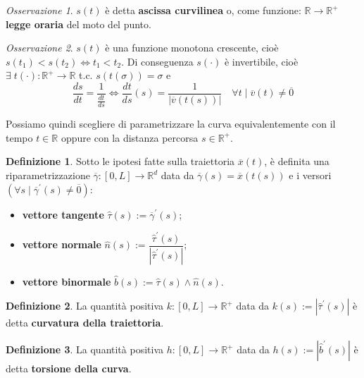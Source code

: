 \documentclass{book}
\theoremstyle{plain}
\theoremstyle{plain}
\theoremstyle{plain}
\theoremstyle{plain}
\theoremstyle{plain}
\theoremstyle{definition}
\newtheorem{defi}{Definizione}[chapter]
\theoremstyle{remark}
\newtheorem*{oss}{Osservazione}
\theoremstyle{definition}
\begin{document}
\begin{oss}
    $s(t)$ è detta \textbf{ascissa curvilinea} o, come funzione: $\mathbb{R} \to \mathbb{R}^{+}$ \textbf{legge oraria} del moto del punto.
    
\end{oss}

\begin{oss}
     $s(t)$ è una funzione monotona crescente, cioè $s(t_1) < s(t_2) \iff t_1 < t_2$. Di conseguenza $s(\cdot)$ è invertibile, cioè  $\exists \; t(\cdot): \mathbb{R}^{+} \to \mathbb{R}$ t.c. $s(t(\sigma))=\sigma$ e
\begin{displaymath}
    \frac{ds}{dt}=\frac{1}{\frac{dt}{ds}} \iff \frac{dt}{ds}(s)=\frac{1}{|\overline{v}(t(s))|} \quad \forall t \mid \overline{v}(t) \neq \overline{0}
\end{displaymath}

\noindent Possiamo quindi scegliere di parametrizzare la curva equivalentemente con il tempo $t \in \mathbb{R}$ oppure con la distanza percorsa $s \in \mathbb{R}^{+}$.
\end{oss}

\begin{defi}
    Sotto le ipotesi fatte sulla traiettoria $\overline{x}(t)$, è definita una riparametrizzazione $\overline{\gamma}: [0, L] \to \mathbb{R}^{d}$ data da $\overline{\gamma}(s)=\overline{x}(t(s))$ e i versori $(\forall s \mid \overline{\gamma}^{\prime}(s)\neq \overline{0})$:
    
    \begin{itemize}
        \item \textbf{vettore tangente} $\hat{\tau}(s):=\overline{\gamma}^{\prime}(s)$;
        \item \textbf{vettore normale} $\hat{n}(s):=\dfrac{\hat{\tau}^{\prime}(s)}{|\hat{\tau}^{\prime}(s)|}$;
        \item \textbf{vettore binormale} $\hat{b}(s):=\hat{\tau}(s) \wedge \hat{n}(s)$.
    \end{itemize}

\end{defi}

\begin{defi}
    La quantità positiva $k: [0, L] \to \mathbb{R}^{+}$ data da $k(s):= |\hat{\tau}^{\prime}(s)|$ è detta \textbf{curvatura della traiettoria}.
\end{defi}

\begin{defi}
    La quantità positiva $h: [0, L] \to \mathbb{R}^{+}$ data da $h(s):= |\hat{b}^{\prime}(s)|$ è detta \textbf{torsione della curva}.
\end{defi}
\end{document}
